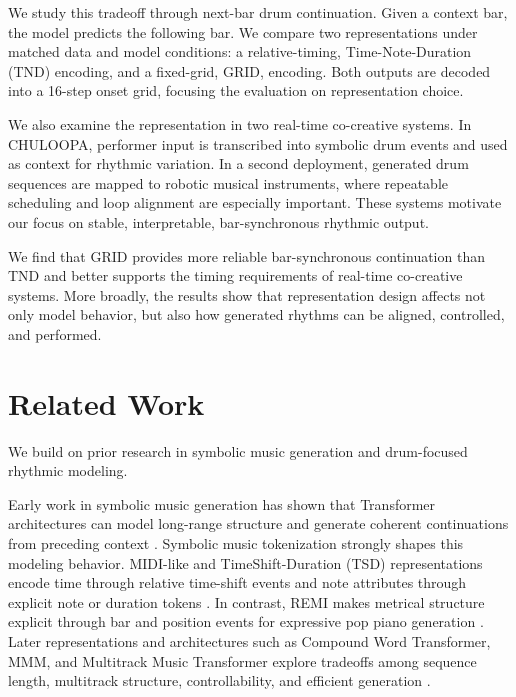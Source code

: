 \documentclass{article}
\begin{document}
We study this tradeoff through next-bar drum continuation. Given a context bar, the model predicts the following bar. We compare two representations under matched data and model conditions: a relative-timing, Time-Note-Duration (TND) encoding, and a fixed-grid, GRID, encoding. Both outputs are decoded into a 16-step onset grid, focusing the evaluation on representation choice.

We also examine the representation in two real-time co-creative systems. In CHULOOPA, performer input is transcribed into symbolic drum events and used as context for rhythmic variation. In a second deployment, generated drum sequences are mapped to robotic musical instruments, where repeatable scheduling and loop alignment are especially important. These systems motivate our focus on stable, interpretable, bar-synchronous rhythmic output.

We find that GRID provides more reliable bar-synchronous continuation than TND and better supports the timing requirements of real-time co-creative systems. More broadly, the results show that representation design affects not only model behavior, but also how generated rhythms can be aligned, controlled, and performed.



\section{Related Work}\label{sec:related_work}
We build on prior research in symbolic music generation and drum-focused rhythmic modeling.

Early work in symbolic music generation has shown that Transformer architectures \cite{VaswaniSPUJGKP17} can model long-range structure and generate coherent continuations from preceding context \cite{huang2018music}. Symbolic music tokenization strongly shapes this modeling behavior. MIDI-like and TimeShift-Duration (TSD) representations encode time through relative time-shift events and note attributes through explicit note or duration tokens \cite{oore_midilike_2018,fradet-etal-2023-byte}.  In contrast, REMI makes metrical structure explicit through bar and position events for expressive pop piano generation \cite{huang2020popmusic}. Later representations and architectures such as Compound Word Transformer, MMM, and Multitrack Music Transformer explore tradeoffs among sequence length, multitrack structure, controllability, and efficient generation \cite{hsiao2021compound,ens2020mmm,dong2023multitrack}.
\end{document}
